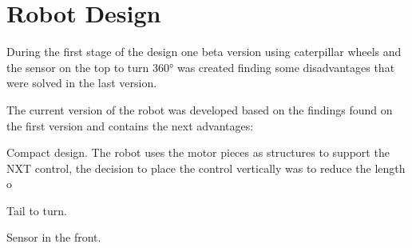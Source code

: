 \documentclass[12pt]{article}
\begin{document}
\section{Robot Design}

During the first stage of the design one beta version using caterpillar wheels and the sensor on the top to turn 360° was created finding some disadvantages that were solved in the last version.

The current version of the robot was developed based on the findings found on the first version and contains the next advantages:

Compact design. The robot uses the motor pieces as structures to support the NXT control, the decision to place the control vertically was to reduce the length o

Tail to turn.

Sensor in the front.
\end{document}
